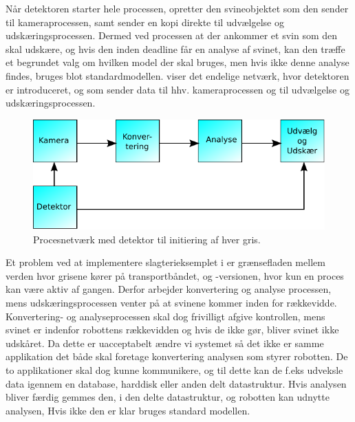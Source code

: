 Når detektoren starter hele processen, opretter den svineobjektet som den sender til kameraprocessen, samt sender en kopi direkte til udvælgelse og udskæringsprocessen. Dermed ved processen at der ankommer et svin som den skal udskære, og hvis den inden deadline får en analyse af svinet, kan den træffe et begrundet valg om hvilken model der skal bruges,  men hvis ikke denne analyse findes, bruges blot standardmodellen.  viser det endelige  netværk, hvor detektoren er introduceret, og som sender data til hhv. kameraprocessen og til udvælgelse og udskæringsprocessen. 

\begin{figure}
 \begin{center}
  \includegraphics[scale=1]{images/pig-network2}
	\caption{Procesnetværk med detektor til initiering af hver gris.}
	\label{fig:pig-network2}
\end{center}
\end{figure}

Et problem ved at implementere  slagterieksemplet i \pycsp er  grænsefladen mellem verden hvor grisene kører på transportbåndet, og  -versionen,  hvor  kun en proces kan være aktiv af gangen. Derfor arbejder konvertering og analyse processen, mens  udskæringsprocessen venter på at svinene kommer inden for rækkevidde. Konvertering- og analyseprocessen  skal dog frivilligt afgive kontrollen, mens svinet er indenfor robottens rækkevidden og hvis de ikke gør, bliver svinet ikke udskåret. Da dette er uacceptabelt ændre vi systemet så det ikke er samme applikation det  både skal foretage konvertering analysen som  styrer robotten. De to applikationer skal dog kunne kommunikere, og til dette kan de f.eks udveksle data igennem en database, harddisk eller anden delt datastruktur. Hvis analysen bliver færdig gemmes den, i den delte datastruktur, og robotten kan udnytte analysen, Hvis ikke den er klar bruges standard modellen.    



